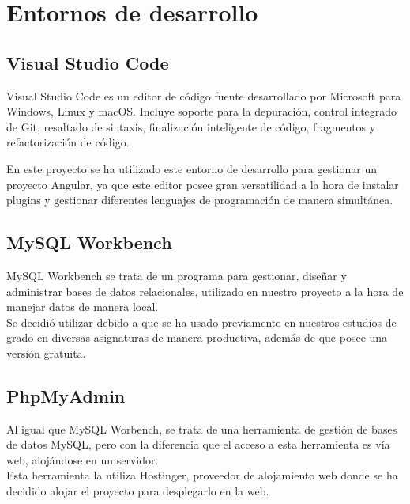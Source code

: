      \section{Entornos de desarrollo}
     
     \subsection{Visual Studio Code}
     Visual Studio Code\cite{vsc} es un editor de código fuente desarrollado por Microsoft para Windows, Linux y macOS. Incluye soporte para la depuración, control integrado de Git, resaltado de sintaxis, finalización inteligente de código, fragmentos y refactorización de código.
    \newline
    
    En este proyecto se ha utilizado este entorno de desarrollo para gestionar un proyecto Angular, ya que este editor posee gran versatilidad a la hora de instalar plugins y gestionar diferentes lenguajes de programación de manera simultánea.
    
     \subsection{MySQL Workbench}
     MySQL Workbench\cite{mysql} se trata de un programa para gestionar, diseñar y administrar bases de datos relacionales, utilizado en nuestro proyecto a la hora de manejar datos de manera local. \\
     \newline
     Se decidió utilizar debido a que se ha usado previamente en nuestros estudios de grado en diversas asignaturas de manera productiva, además de que posee una versión gratuita.
     
     \subsection{PhpMyAdmin}
     Al igual que MySQL Worbench, se trata de una herramienta de gestión de bases de datos MySQL, pero con la diferencia que el acceso a esta herramienta es vía web, alojándose en un servidor.\\
     \newline
     Esta herramienta la utiliza Hostinger\cite{hostinger},  proveedor de alojamiento web donde se ha decidido alojar el proyecto para desplegarlo en la web.
     
